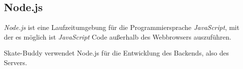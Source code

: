 \subsection{Node.js}
\label{nodejs}

\textit{Node.js} ist eine Laufzeitumgebung für die Programmiersprache \textit{JavaScript}, mit der es möglich ist \textit{JavaScript} Code außerhalb des Webbrowsers auszuführen.

Skate-Buddy verwendet Node.js für die Entwicklung des Backends, also des Servers.
